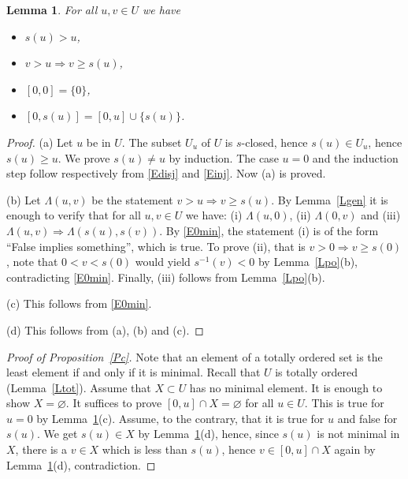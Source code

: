 \documentclass[12pt,letterpaper]{article}
\newtheorem{lem}[thm]{Lemma} %
\begin{document}
\begin{lem}\label{Lprelim} 
For all \(u,v\in U\) we have 
 \begin{itemize} 
  \item[\emph{(a)}] \(s(u)>u\),  
  \item[\emph{(b)}] \(v>u\Rightarrow v\ge s(u)\), 
  \item[\emph{(c)}] \([0,0]=\{0\}\),  
  \item[\emph{(d)}] \([0,s(u)]=[0,u]\cup\{s(u)\}\). 
 \end{itemize}
\end{lem} 
\begin{proof} 
(a) Let \(u\) be in \(U\). The subset \(U_u\) of \(U\) is \(s\)-closed, hence \(s(u)\in U_u\), hence \(s(u)\ge u\). We prove \(s(u)\ne u\) by induction. The case \(u=0\) and the induction step follow respectively from \eqref{Edisj} and \eqref{Einj}. Now (a) is proved. 

(b) Let \(\Lambda(u,v)\) be the statement \(v>u\Rightarrow v\ge s(u)\). By Lemma~\ref{Lgen} it is enough to verify that for all \(u,v\in U\) we have: (i) \(\Lambda(u,0)\), (ii) \(\Lambda(0,v)\) and (iii) \(\Lambda(u,v)\Rightarrow\Lambda(s(u),s(v))\). By \eqref{E0min}, the statement (i) is of the form ``False implies something'', which is true. To prove (ii), that is \(v>0\Rightarrow v\ge s(0)\), note that \(0<v<s(0)\) would yield \(s^{-1}(v)<0\) by Lemma~\ref{Lpo}(b), contradicting \eqref{E0min}. Finally, (iii) follows from Lemma~\ref{Lpo}(b). 

(c) This follows from \eqref{E0min}. 

(d) This follows from (a), (b) and (c). 
\end{proof} 

\begin{proof}[Proof of Proposition~\ref{Pc}] 
Note that an element of a totally ordered set is the least element if and only if it is minimal. Recall that \(U\) is totally ordered (Lemma~\ref{Ltot}). Assume that \(X\subset U\) has no minimal element. It is enough to show \(X=\varnothing\). It suffices to prove \([0,u]\cap X=\varnothing\) for all \(u\in U\). This is true for \(u=0\) by Lemma~\ref{Lprelim}(c). Assume, to the contrary, that it is true for \(u\) and false for \(s(u)\). We get \(s(u)\in X\) by Lemma~\ref{Lprelim}(d), hence, since \(s(u)\) is not minimal in \(X\), there is a \(v\in X\) which is less than \(s(u)\), hence \(v\in[0,u]\cap X\) again by Lemma~\ref{Lprelim}(d), contradiction. 
\end{proof} 
\end{document}
